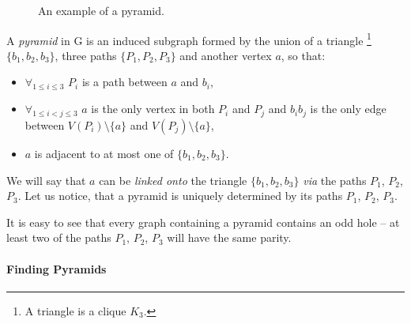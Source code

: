 \begin{wrapfigure}{r}{0.35\textwidth}
	
	\caption{An example  of a pyramid.}%
	\vspace{-1.2cm}
\end{wrapfigure}


A \emph{pyramid} in G is an induced subgraph formed by the union of a triangle \footnote{A triangle is a clique $K_3$.} $\{b_1,b_2,b_3\}$, three paths $\{P_1, P_2, P_3\}$ and another vertex $a$, so that:
\begin{itemize}
	\item $\forall_{1\leq i \leq 3}$ $P_i$ is a path between $a$ and $b_i$,
	\item $\forall_{1\leq i < j \leq 3}$ $a$ is the only vertex in both $P_i$ and $P_j$ and $b_ib_j$ is the only edge between $V(P_i)\setminus\{a\}$ and $V(P_j)\setminus\{a\}$,
	\item $a$ is adjacent to at most one of $\{b_1, b_2, b_3\}$.
\end{itemize}

We will say that $a$ can be \emph{linked onto} the triangle $\{b_1, b_2, b_3\}$ \emph{via} the paths $P_1$, $P_2$, $P_3$. Let us notice, that a pyramid is uniquely determined by its paths $P_1$, $P_2$, $P_3$.

It is easy to see that every graph containing a pyramid contains an odd hole -- at least two of the paths $P_1$, $P_2$, $P_3$ will have the same parity.

\paragraph{Finding Pyramids}



